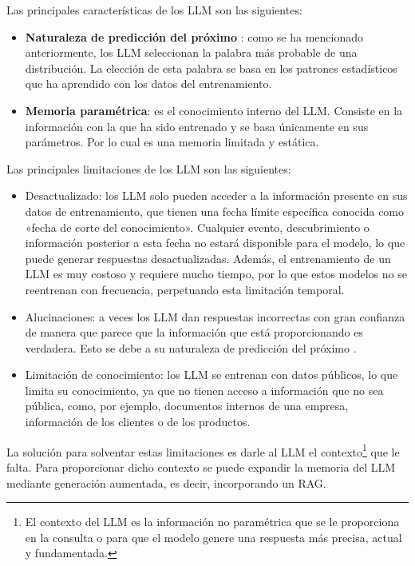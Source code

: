 Las principales características de los LLM son las siguientes:
\begin{itemize}
\tightlist
	\item \textbf{Naturaleza de predicción del próximo }: como se ha mencionado anteriormente, los LLM seleccionan la palabra más probable de una distribución. La elección de esta palabra se basa en los patrones estadísticos que ha aprendido con los datos del entrenamiento.
	\item \textbf{Memoria paramétrica}: es el conocimiento interno del LLM. Consiste en la información con la que ha sido entrenado y se basa únicamente en sus parámetros. Por lo cual es una memoria limitada y estática.
\end{itemize}

Las principales limitaciones de los LLM son las siguientes:
\begin{itemize}
\tightlist
	\item Desactualizado: los LLM solo pueden acceder a la información presente en sus datos de entrenamiento, que tienen una fecha límite específica conocida como «fecha de corte del conocimiento». Cualquier evento, descubrimiento o información posterior a esta fecha no estará disponible para el modelo, lo que puede generar respuestas desactualizadas. Además, el entrenamiento de un LLM es muy costoso y requiere mucho tiempo, por lo que estos modelos no se reentrenan con frecuencia, perpetuando esta limitación temporal. 
	\item Alucinaciones: a veces los LLM dan respuestas incorrectas con gran confianza de manera que parece que la información que está proporcionando es verdadera. Esto se debe a su naturaleza de predicción del próximo . 
	\item Limitación de conocimiento: los LLM se entrenan con datos públicos, lo que limita su conocimiento, ya que no tienen acceso a información que no sea pública, como, por ejemplo, documentos internos de una empresa, información de los clientes o de los productos.
\end{itemize}

La solución para solventar estas limitaciones es darle al LLM el contexto\footnote{El contexto del LLM es la información no paramétrica que se le proporciona en la consulta o  para que el modelo genere una respuesta más precisa, actual y fundamentada.} que le falta. Para proporcionar dicho contexto se puede expandir la memoria del LLM mediante generación aumentada, es decir, incorporando un RAG.

